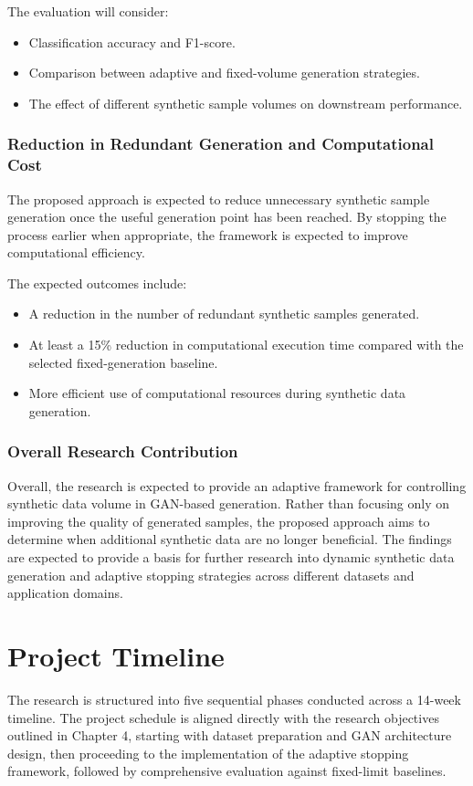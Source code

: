 \documentclass[12pt,a4paper]{report}
\begin{document}
\begin{justify}
The evaluation will consider:
\begin{itemize}
    \item Classification accuracy and F1-score.
    \item Comparison between adaptive and fixed-volume generation strategies.
    \item The effect of different synthetic sample volumes on downstream performance.
\end{itemize}

\subsection{Reduction in Redundant Generation and Computational Cost}

The proposed approach is expected to reduce unnecessary synthetic sample generation once the useful generation point has been reached. By stopping the process earlier when appropriate, the framework is expected to improve computational efficiency.

The expected outcomes include:
\begin{itemize}
    \item A reduction in the number of redundant synthetic samples generated.
    \item At least a 15\% reduction in computational execution time compared with the selected fixed-generation baseline.
    \item More efficient use of computational resources during synthetic data generation.
\end{itemize}

\subsection{Overall Research Contribution}

Overall, the research is expected to provide an adaptive framework for controlling synthetic data volume in GAN-based generation. Rather than focusing only on improving the quality of generated samples, the proposed approach aims to determine when additional synthetic data are no longer beneficial. The findings are expected to provide a basis for further research into dynamic synthetic data generation and adaptive stopping strategies across different datasets and application domains.


\chapter{Project Timeline}
The research is structured into five sequential phases conducted across a 14-week timeline. The project schedule is aligned directly with the research objectives outlined in Chapter 4, starting with dataset preparation and GAN architecture design, then proceeding to the implementation of the adaptive stopping framework, followed by comprehensive evaluation against fixed-limit baselines.


\end{justify}
\end{document}
